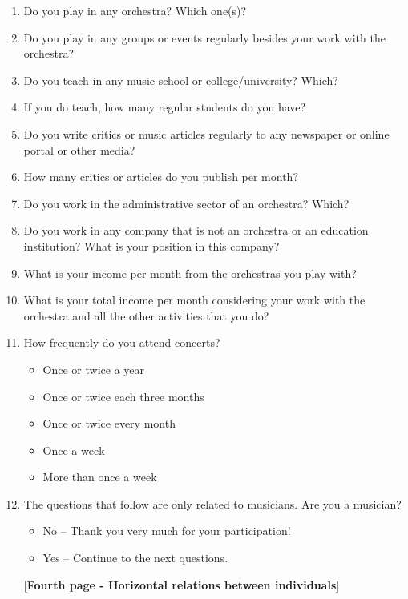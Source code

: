 \documentclass[a4paper, 12pt, openright, oneside, german, french, brazil, english]{abntex2}
\begin{document}
\begin{enumerate}
        \item Do you play in any orchestra? Which one(s)?
        \item Do you play in any groups or events regularly besides your work with the orchestra?
        \item Do you teach in any music school or college/university? Which?
        \item If you do teach, how many regular students do you have?
        \item Do you write critics or music articles regularly to any newspaper or online portal or other media?
        \item How many critics or articles do you publish per month?
        \item Do you work in the administrative sector of an orchestra? Which?
        \item Do you work in any company that is not an orchestra or an education institution? What is your position in this company?
        \item What is your income per month from the orchestras you play with?
        \item What is your total income per month considering your work with the orchestra and all the other activities that you do?

        \item How frequently do you attend concerts?
          \begin{itemize}
          \item Once or twice a year
          \item Once or twice each three months
          \item Once or twice every month
          \item Once a week
          \item More than once a week
          \end{itemize}

          
        \item The questions that follow are only related to musicians. Are you a musician?
          \begin{itemize}
          \item No -- Thank you very much for your participation!
          \item Yes -- Continue to the next questions.
          \end{itemize}


          
        [\textbf{Fourth page - Horizontal relations between individuals}]
        

\end{enumerate}
\end{document}
